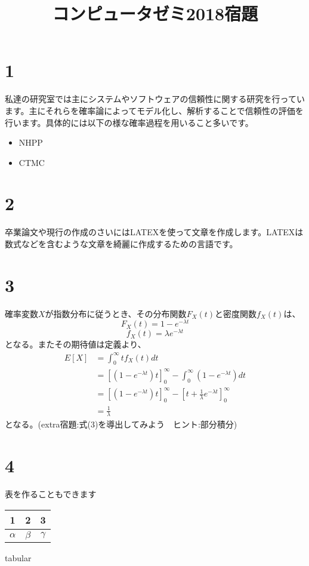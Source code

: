\documentclass[a4paper,12pt]{article}
\title{コンピュータゼミ2018宿題}
\begin{document}
\maketitle
\section{1}
私達の研究室では主にシステムやソフトウェアの信頼性に関する研究を行っています。主にそれらを確率論によってモデル化し、解析することで信頼性の評価を行います。具体的には以下の様な確率過程を用いること多いです。
\begin{itemize}
\item NHPP
\item CTMC
\end{itemize}
\section{2}
卒業論文や現行の作成のさいにはLATEXを使って文章を作成します。LATEXは数式などを含むような文章を綺麗に作成するための言語です。
\section{3}
確率変数$X$が指数分布に従うとき、その分布関数$F_{X}(t)$と密度関数$f_{X}(t)$は、
\begin{equation}
F_{X}(t) = 1-e^{-{\lambda} t}
\end{equation}
\begin{equation}
f_{X}(t) = {\lambda}e^{-{\lambda}t}
\end{equation}
となる。またその期待値は定義より、
\begin{equation}
\begin{aligned}
    E[X]&=\int_{0}^{\infty}tf_{X}(t)dt\\
        &=[(1-e^{-{\lambda}t})t]^\infty_{0}-\int_{0}^{\infty}(1-e^{-{\lambda}t})dt\\
        &=[(1-e^{-{\lambda}t})t]^\infty_{0}-[t+\frac{1}{{\lambda}}e^{-{\lambda}t}]^\infty_{0}\\
        &=\frac{1}{{\lambda}}
\end{aligned}
\end{equation}
となる。(extra宿題:式(3)を導出してみよう　ヒント:部分積分)
\section{4}
表を作ることもできます
\begin{table}[!hbt]
\centering
\begin{tabular}{|c|c|c|}
\hline
1&2&3\\
\hline
${\alpha}$&${\beta}$&${\gamma}$  \\
\hline
\end{tabular}
\end{table}{tabular}
\end{document}
